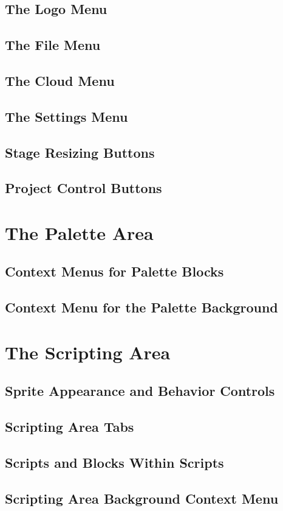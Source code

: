 \documentclass{report}
\begin{document}
\subsection{The \Snap{} Logo Menu}
\subsection{The File Menu}
\subsection{The Cloud Menu}
\subsection{The Settings Menu}
\subsection{Stage Resizing Buttons}
\subsection{Project Control Buttons}
\section{The Palette Area}
\subsection{Context Menus for Palette Blocks}
\subsection{Context Menu for the Palette Background}
\section{The Scripting Area}
\subsection{Sprite Appearance and Behavior Controls}
\subsection{Scripting Area Tabs}
\subsection{Scripts and Blocks Within Scripts}
\subsection{Scripting Area Background Context Menu}
\end{document}
